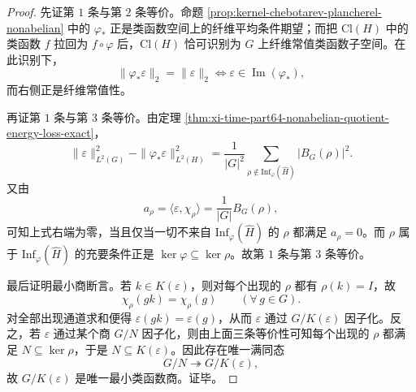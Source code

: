 \begin{proof}
先证第 \(1\) 条与第 \(2\) 条等价。命题 \ref{prop:kernel-chebotarev-plancherel-nonabelian} 中的 \(\varphi_\ast\) 正是类函数空间上的纤维平均条件期望；而把 \(\mathrm{Cl}(H)\) 中的类函数 \(f\) 拉回为 \(f\circ\varphi\) 后，\(\mathrm{Cl}(H)\) 恰可识别为 \(G\) 上纤维常值类函数子空间。在此识别下，
\[
\|\varphi_\ast\varepsilon\|_2=\|\varepsilon\|_2
\iff
\varepsilon\in \operatorname{Im}(\varphi_\ast),
\]
而右侧正是纤维常值性。

再证第 \(1\) 条与第 \(3\) 条等价。由定理 \ref{thm:xi-time-part64-nonabelian-quotient-energy-loss-exact}，
\[
\|\varepsilon\|_{L^2(G)}^2-\|\varphi_\ast\varepsilon\|_{L^2(H)}^2
=
\frac1{|G|^2}
\sum_{\rho\notin \mathrm{Inf}_\varphi(\widehat H)}
|B_G(\rho)|^2.
\]
又由
\[
a_\rho=\langle \varepsilon,\chi_\rho\rangle
=
\frac{1}{|G|}B_G(\rho),
\]
可知上式右端为零，当且仅当一切不来自 \(\mathrm{Inf}_\varphi(\widehat H)\) 的 \(\rho\) 都满足 \(a_\rho=0\)。而 \(\rho\) 属于 \(\mathrm{Inf}_\varphi(\widehat H)\) 的充要条件正是 \(\ker\varphi\subseteq \ker\rho\)。故第 \(1\) 条与第 \(3\) 条等价。

最后证明最小商断言。若 \(k\in K(\varepsilon)\)，则对每个出现的 \(\rho\) 都有 \(\rho(k)=I\)，故
\[
\chi_\rho(gk)=\chi_\rho(g)
\qquad(\forall\,g\in G).
\]
对全部出现通道求和便得 \(\varepsilon(gk)=\varepsilon(g)\)，从而 \(\varepsilon\) 通过 \(G/K(\varepsilon)\) 因子化。反之，若 \(\varepsilon\) 通过某个商 \(G/N\) 因子化，则由上面三条等价性可知每个出现的 \(\rho\) 都满足 \(N\subseteq \ker\rho\)，于是 \(N\subseteq K(\varepsilon)\)。因此存在唯一满同态
\[
G/N\twoheadrightarrow G/K(\varepsilon),
\]
故 \(G/K(\varepsilon)\) 是唯一最小类函数商。证毕。
\end{proof}

